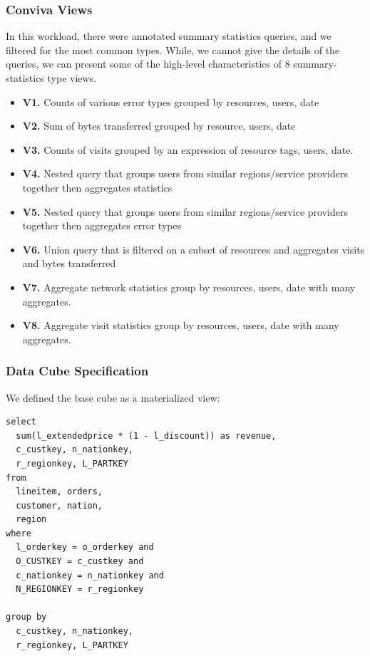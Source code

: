 \subsubsection{Conviva Views}
In this workload, there were annotated summary statistics queries, and we filtered for the most common types.
While, we cannot give the details of the queries, we can present some of the high-level characteristics of 8 summary-statistics type views. 
\begin{itemize} 
\item \textbf{V1.} Counts of various error types grouped by resources, users, date
\item \textbf{V2.} Sum of bytes transferred grouped by resource, users, date
\item \textbf{V3.} Counts of visits grouped by an expression of resource tags, users, date.
\item \textbf{V4.} Nested query that groups users from similar regions/service providers together then aggregates statistics
\item \textbf{V5.} Nested query that groups users from similar regions/service providers together then aggregates error types
\item \textbf{V6.} Union query that is filtered on a subset of resources and aggregates visits and bytes transferred
\item \textbf{V7.} Aggregate network statistics group by resources, users, date with many aggregates.
\item \textbf{V8.} Aggregate visit statistics group by resources, users, date with many aggregates.
\end{itemize}

\subsubsection{Data Cube Specification}
We defined the base cube as a materialized view:
\begin{lstlisting}
select
  sum(l_extendedprice * (1 - l_discount)) as revenue,
  c_custkey, n_nationkey,
  r_regionkey, L_PARTKEY
from
  lineitem, orders,
  customer, nation,
  region
where
  l_orderkey = o_orderkey and
  O_CUSTKEY = c_custkey and
  c_nationkey = n_nationkey and
  N_REGIONKEY = r_regionkey

group by
  c_custkey, n_nationkey, 
  r_regionkey, L_PARTKEY
\end{lstlisting}

